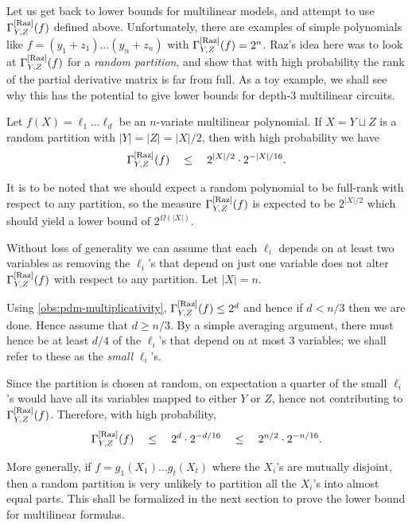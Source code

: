 Let us get back to lower bounds for multilinear models, and attempt to use $\Gamma^{\mathrm{[Raz]}}_{Y,Z}(f)$ defined above. 
Unfortunately, there are examples of simple polynomials like $f = (y_1 + z_1)\dots (y_n + z_n)$ with $\Gamma^{\mathrm{[Raz]}}_{Y,Z}(f) = 2^n$. 
Raz's idea here was to look at $\Gamma^{\mathrm{[Raz]}}_{Y,Z}(f)$ for a \emph{random partition}, and show that with high probability the rank of the partial derivative matrix is far from full. 
As a toy example, we shall see why this has the potential to give lower bounds for depth-$3$ multilinear circuits. 

\begin{lemma}\label{lem:raz-depth-three}
Let $f(X) = \ell_1 \dots \ell_d$ be an $n$-variate multilinear polynomial. 
If $X = Y\sqcup Z$ is a random partition with $|Y| = |Z| = |X|/2$, then with high probability we have
$$
\Gamma^{\mathrm{[Raz]}}_{Y,Z}(f) \quad \leq \quad 2^{|X|/2} \cdot 2^{-|X|/16}.
$$
\end{lemma}

It is to be noted that we should expect a random polynomial to be full-rank with respect to any partition, so the measure $\Gamma^{\mathrm{[Raz]}}_{Y,Z}(f)$ is expected to be $2^{|X|/2}$ which should yield a lower bound of $2^{\Omega(|X|)}$. 

\begin{proof-sketch}
Without loss of generality we can assume that each $\ell_i$ depends on at least two variables as removing the $\ell_i$'s that depend on just one variable does not alter $\Gamma^{\mathrm{[Raz]}}_{Y,Z}(f)$ with respect to any partition. 
Let $|X| = n$. 

Using \autoref{obs:pdm-multiplicativity}, $\Gamma^{\mathrm{[Raz]}}_{Y,Z}(f) \leq 2^d$ and hence if $d < n/3$ then we are done. 
Hence assume that $d \geq n/3$. 
By a simple averaging argument, there must hence be at least $d/4$ of the $\ell_i$'s that depend on at most $3$ variables; we shall refer to these as the \emph{small} $\ell_i$'s. 

Since the partition is chosen at random, on expectation a quarter of the small $\ell_i$'s would have all its variables mapped to either $Y$ or $Z$, hence not contributing to $\Gamma^{\mathrm{[Raz]}}_{Y,Z}(f)$. 
Therefore, with high probability,
$$
\Gamma^{\mathrm{[Raz]}}_{Y,Z}(f) \quad \leq \quad 2^{d} \cdot 2^{-d/16} \quad \leq \quad 2^{n/2} \cdot 2^{-n/16}.
$$
\end{proof-sketch}

More generally, if $f = g_1(X_1)\dots g_t(X_t)$ where the $X_i$'s are mutually disjoint, then a random partition is very unlikely to partition all the $X_i$'s into almost equal parts. 
This shall be formalized in the next section to prove the lower bound for multilinear formulas. 

